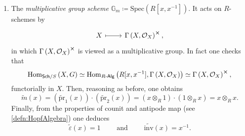 \begin{ex}
\begin{enumerate}
		\item The {\em multiplicative group scheme} 
			$\mathbb{G}_m \coloneqq \mathrm{Spec}(R[x,x^{-1}])$.
			It acts on $R$-schemes by
			\begin{equation*}
			\begin{tikzcd}[row sep = 0ex
				,/tikz/column 1/.append style={anchor=base east}
				,/tikz/column 2/.append style={anchor=base west}]
				X \arrow[r, "", mapsto] & 
				\Gamma \left( X , \mathcal{O}_{ X } \right)^{\cross}
			,\end{tikzcd}
			\end{equation*} 
			in which $\Gamma \left( X , \mathcal{O}_{ X } \right)^{\cross}$ is viewed
			as a multiplicative group.
			In fact one checks that
			\begin{equation*}
			\mathrm{Hom}_{\mathsf{Sch}/S} \left( X, G \right) \simeq
			\mathrm{Hom}_{R \text{-}\mathsf{Alg}} 
			\left( R[x, x^{-1}], \Gamma \left( X , \mathcal{O}_{ X } \right) \right) \simeq
			\Gamma \left( X , \mathcal{O}_{ X } \right)^{\cross}
			,\end{equation*} 
			functorially in $X$.
			Then, reasoning as before, one obtains
			\begin{equation*}
				\widetilde{m}(x) =
				\left( \widetilde{\mathrm{pr}}_1(x) \right) \cdot
				\left( \widetilde{\mathrm{pr}}_2(x) \right) =
				(x \otimes_R 1) \cdot (1 \otimes_R x) = 
				x \otimes_R x
			.\end{equation*} 
			Finally, from the properties  of counit and antipode map
			(see \cref{defn:HopfAlgebra}) one deduces
			\begin{equation*}
				\widetilde{\varepsilon}(x) = 1
				\qquad \text{ and } \qquad
				\widetilde{\mathrm{inv}}(x) = x^{-1}
			.\end{equation*} 



\end{enumerate}
\end{ex}
